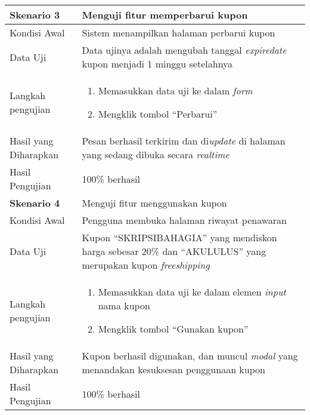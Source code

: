 \begin{longtable}{|X|X|}
		
	\textbf{Skenario 3}
		& Menguji fitur memperbarui kupon \\ \hline
	Kondisi Awal
		& Sistem menampilkan halaman perbarui kupon\\ \hline
	Data Uji
		& Data ujinya adalah mengubah tanggal \textit{expiredate} kupon menjadi 1 minggu setelahnya \\ \hline
	Langkah pengujian
		& \begin{enumerate}
		\item Memasukkan data uji ke dalam \textit{form}
		\item Mengklik tombol ``Perbarui''
	\end{enumerate} \\ \hline
	Hasil yang Diharapkan
		& Pesan berhasil terkirim dan di\textit{update} di halaman yang sedang dibuka secara \textit{realtime} \\ \hline
	Hasil Pengujian
		& 100\% berhasil \\ \hline		
		
		
	\textbf{Skenario 4}
		& Menguji fitur menggunakan kupon \\ \hline
	Kondisi Awal
		& Pengguna membuka halaman riwayat penawaran\\ \hline
	Data Uji
		& Kupon ``SKRIPSIBAHAGIA'' yang mendiskon harga sebesar 20\% dan ``AKULULUS'' yang merupakan kupon \textit{freeshipping}  \\ \hline
	Langkah pengujian
		& \begin{enumerate}
		\item Memasukkan data uji ke dalam elemen \textit{input} nama kupon
		\item Mengklik tombol ``Gunakan kupon''
	\end{enumerate} \\ \hline
	Hasil yang Diharapkan
		& Kupon berhasil digunakan, dan muncul \textit{modal} yang menandakan kesuksesan penggunaan kupon \\ \hline
	Hasil Pengujian
		& 100\% berhasil \\ \hline	

\end{longtable}